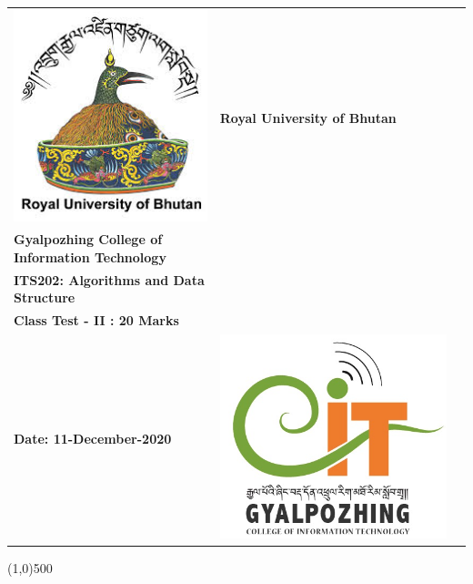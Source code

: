 \documentclass[12pt,a4paper]{article}
\author{Sonam Wangmo}
\begin{document}
	 \begin{center}
		\setlength{\tabcolsep}{0pt}
		\begin{tabular}{>{\raggedleft}m{3cm}>{\centering}m{\dimexpr\textwidth - 5cm\relax}>{\raggedright}m{3.5cm}}
			\includegraphics[width=\linewidth]{1}%
			&%
			\textbf{Royal University of Bhutan} \\ 
			\textbf{Gyalpozhing College of Information Technology} \\
			\textbf{ITS202: Algorithms and Data Structure} \\
			\textbf{Class Test - II : 20 Marks} \\
			\textbf{Date: 11-December-2020}
			&%
			\includegraphics[width=\linewidth]{2} %
		\end{tabular}
	\line(1,0){500}
	\end{center}
	
\end{document}
